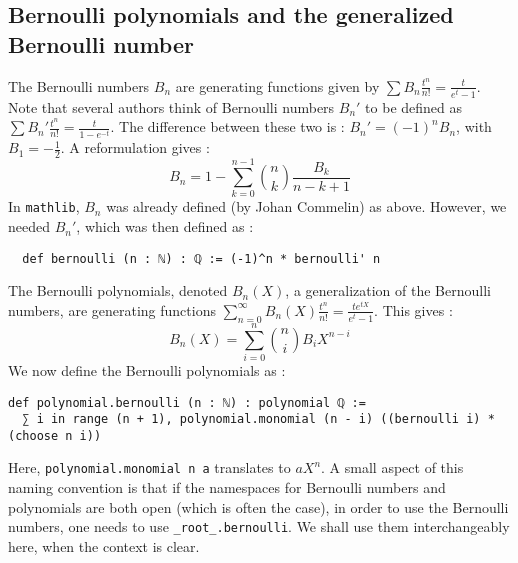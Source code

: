 \documentclass[a4paper,UKenglish,cleveref, autoref, thm-restate]{lipics-v2021}
\newcommand{\lean}[1]{\texttt{#1}\xspace} %
\begin{document}
\subsection{Bernoulli polynomials and the generalized Bernoulli number}
The Bernoulli numbers $B_n$ are generating functions given by $\sum B_n\frac{t^n}{n!}=\frac{t}{e^{t} - 1}$. 
Note that several authors think of Bernoulli numbers $B_n'$ to be defined as $\sum B_n'\frac{t^n}{n!}=\frac{t}{1-e^{-t}}$. 
The difference between these two is : $B_n' = (-1)^n B_n$, with $B_1 = - \frac{1}{2}$.
A reformulation gives :
$$ B_n = 1 - \sum_{k = 0}^{n - 1} {n \choose k} \frac{B_k}{n - k + 1} $$
In \lean{mathlib}, $B_n$ was already defined (by Johan Commelin) as above. However, we needed $B_n'$, which was then defined as :
\begin{lstlisting}
  def bernoulli (n : ℕ) : ℚ := (-1)^n * bernoulli' n
\end{lstlisting}
The Bernoulli polynomials, denoted $B_n(X)$, a generalization of the Bernoulli numbers,
are generating functions $ \sum_{n = 0}^{\infty} B_n(X) \frac{t^n}{n!} = \frac{t e^{tX}}{e^t - 1} $. 
This gives :
$$ B_n (X) = \sum_{i = 0}^n {n \choose i} B_i X^{n - i} $$
We now define the Bernoulli polynomials as :
\begin{lstlisting}
def polynomial.bernoulli (n : ℕ) : polynomial ℚ :=
  ∑ i in range (n + 1), polynomial.monomial (n - i) ((bernoulli i) * (choose n i))
\end{lstlisting}
Here, \lean{polynomial.monomial n a} translates to $a X^n$. A small aspect of this 
naming convention is that if the namespaces for Bernoulli numbers and polynomials are both open 
(which is often the case), in order to use the Bernoulli numbers, one needs to use \lean{\_root\_.bernoulli}. 
We shall use them interchangeably here, when the context is clear. 
\end{document}
